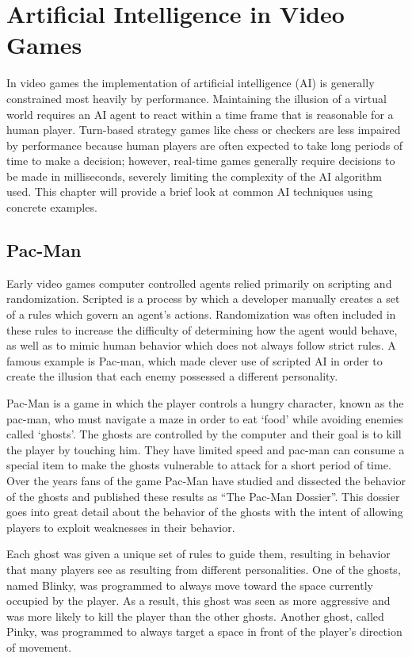 \chapter{Artificial Intelligence in Video Games}

In video games the implementation of artificial intelligence (AI) is generally constrained most heavily by performance. Maintaining the illusion of a virtual world requires an AI agent to react within a time frame that is reasonable for a human player. Turn-based strategy games like chess or checkers are less impaired by performance because human players are often expected to take long periods of time to make a decision; however, real-time games generally require decisions to be made in milliseconds, severely limiting the complexity of the AI algorithm used. This chapter will provide a brief look at common AI techniques using concrete examples.

\section{Pac-Man}

Early video games computer controlled agents relied primarily on scripting and randomization. Scripted is a process by which a developer manually creates a set of a rules which govern an agent's actions. Randomization was often included in these rules to increase the difficulty of determining how the agent would behave, as well as to mimic human behavior which does not always follow strict rules. A famous example is Pac-man, which made clever use of scripted AI in order to create the illusion that each enemy possessed a different personality. \cite{pacman}

Pac-Man is a game in which the player controls a hungry character, known as the pac-man, who must navigate a maze in order to eat `food' while avoiding enemies called `ghosts'. The ghosts are controlled by the computer and their goal is to kill the player by touching him. They have limited speed and pac-man can consume a special item to make the ghosts vulnerable to attack for a short period of time. Over the years fans of the game Pac-Man have studied and dissected the behavior of the ghosts and published these results as ``The Pac-Man Dossier''. \cite{pacman} This dossier goes into great detail about the behavior of the ghosts with the intent of allowing players to exploit weaknesses in their behavior.

Each ghost was given a unique set of rules to guide them, resulting in behavior that many players see as resulting from different personalities. One of the ghosts, named Blinky, was programmed to always move toward the space currently occupied by the player. As a result, this ghost was seen as more aggressive and was more likely to kill the player than the other ghosts. Another ghost, called Pinky, was programmed to always target a space in front of the player's direction of movement.

